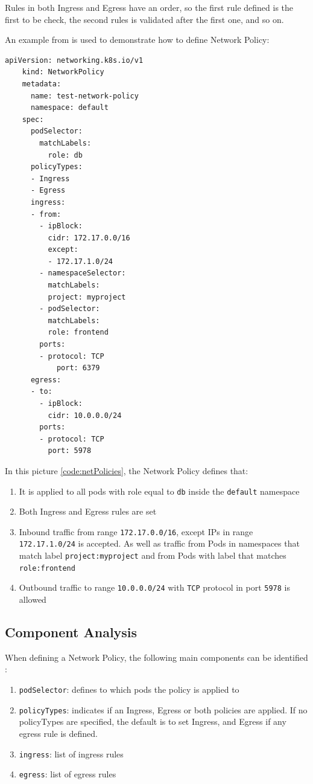 \documentclass[a4paper,11pt,openright,BCOR=15mm]{scrbook}
\begin{document}
Rules in both Ingress and Egress have an order, so the first rule defined is the first to be check, the second rules is validated after the first one, and so on.

An example from \cite{network_policies_kubernetes_from_kubernetes_io} is used to demonstrate how to define Network Policy:

\begin{lstlisting}[style=yaml,caption={NetworkPolicies example},label=code:netPolicies]
	apiVersion: networking.k8s.io/v1
	kind: NetworkPolicy
	metadata:
	  name: test-network-policy
	  namespace: default
	spec:
	  podSelector:
		matchLabels:
		  role: db
	  policyTypes:
	  - Ingress
	  - Egress
	  ingress:
	  - from:
		- ipBlock:
		  cidr: 172.17.0.0/16
		  except:
		  - 172.17.1.0/24
		- namespaceSelector:
		  matchLabels:
		  project: myproject
		- podSelector:
		  matchLabels:
		  role: frontend
		ports:
		- protocol: TCP
			port: 6379
	  egress:
	  - to:
		- ipBlock:
		  cidr: 10.0.0.0/24
		ports:
		- protocol: TCP
		  port: 5978
\end{lstlisting}

In this picture \ref{code:netPolicies}, the Network Policy defines that:

\begin{enumerate}
	\item It is applied to all pods with role equal to \texttt{db} inside the \texttt{default} namespace
	\item Both Ingress and Egress rules are set
	\item Inbound traffic from range \texttt{172.17.0.0/16}, except IPs in range \texttt{172.17.1.0/24} is accepted. As well as traffic from Pods in namespaces that match label \texttt{project:myproject} and from Pods with label that matches \texttt{role:frontend}
	\item Outbound traffic to range \texttt{10.0.0.0/24} with \texttt{TCP} protocol in port \texttt{5978} is allowed
\end{enumerate}

\subsection{Component Analysis}

When defining a Network Policy, the following main components can be identified \cite{amaechi_learn_2023}:

\begin{enumerate}
	\item \texttt{podSelector}: defines to which pods the policy is applied to
	\item \texttt{policyTypes}: indicates if an Ingress, Egress or both policies are applied. If no policyTypes are specified, the default is to set Ingress, and Egress if any egress rule is defined.
	\item \texttt{ingress}: list of ingress rules
	\item \texttt{egress}: list of egress rules
\end{enumerate}
\end{document}

